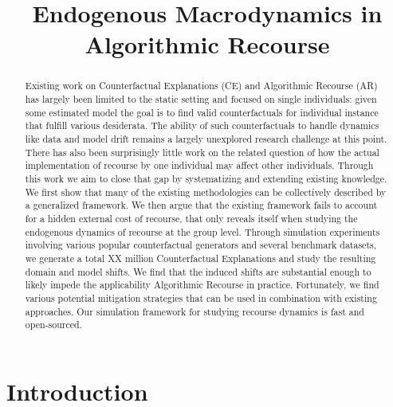 \documentclass[
  conference]{IEEEtran}
\title{Endogenous Macrodynamics in Algorithmic Recourse}
\author{}
\date{}
\begin{document}
\maketitle
\begin{abstract}
Existing work on Counterfactual Explanations (CE) and Algorithmic
Recourse (AR) has largely been limited to the static setting and focused
on single individuals: given some estimated model the goal is to find
valid counterfactuals for individual instance that fulfill various
desiderata. The ability of such counterfactuals to handle dynamics like
data and model drift remains a largely unexplored research challenge at
this point. There has also been surprisingly little work on the related
question of how the actual implementation of recourse by one individual
may affect other individuals. Through this work we aim to close that gap
by systematizing and extending existing knowledge. We first show that
many of the existing methodologies can be collectively described by a
generalized framework. We then argue that the existing framework fails
to account for a hidden external cost of recourse, that only reveals
itself when studying the endogenous dynamics of recourse at the group
level. Through simulation experiments involving various popular
counterfactual generators and several benchmark datasets, we generate a
total XX million Counterfactual Explanations and study the resulting
domain and model shifts. We find that the induced shifts are substantial
enough to likely impede the applicability Algorithmic Recourse in
practice. Fortunately, we find various potential mitigation strategies
that can be used in combination with existing approaches. Our simulation
framework for studying recourse dynamics is fast and open-sourced.
\end{abstract}
\ifdefined\Shaded\renewenvironment{Shaded}{\begin{tcolorbox}[boxrule=0pt, sharp corners, enhanced, interior hidden, borderline west={3pt}{0pt}{shadecolor}, frame hidden, breakable]}{\end{tcolorbox}}\fi

\hypertarget{sec-intro}{%
\section{Introduction}\label{sec-intro}}
\end{document}
